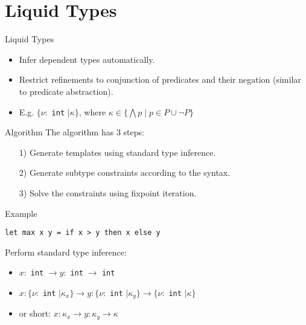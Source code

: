 \documentclass[pdf]{beamer}
\begin{document}
\section{Liquid Types}
\begin{frame}{Liquid Types}
  \begin{itemize}
    \item Infer dependent types automatically.
    \item Restrict refinements to conjunction of predicates and their negation (similar to predicate abstraction).
    \item E.g. $\{\nu:$ \lstinline{int} $\mid \kappa\}$, where $\kappa \in \{\bigwedge p \mid p \in P \cup \neg P\}$
  \end{itemize}
\end{frame}

\begin{frame}{Algorithm}
  The algorithm has 3 steps:
  \begin{itemize}
    \item[1)] Generate templates using standard type inference.
    \item[2)] Generate subtype constraints according to the syntax.
    \item[3)] Solve the constraints using fixpoint iteration.
  \end{itemize}
\end{frame}

\begin{frame}[fragile]{Example}
  \begin{lstlisting}
let max x y = if x > y then x else y
  \end{lstlisting}
  Perform standard type inference:
  \begin{itemize}
    \item $x:$ \lstinline{int} $\rightarrow y:$ \lstinline{int} $\rightarrow$ \lstinline{int}
    \item $x: \{\nu:$ \lstinline{int} $\mid \kappa_x\} \rightarrow y: \{\nu:$ \lstinline{int} $\mid \kappa_y\} \rightarrow \{\nu:$ \lstinline{int} $\mid \kappa\}$
    \item or short: $x: \kappa_x \rightarrow y: \kappa_y \rightarrow \kappa$
  \end{itemize}
\end{frame}
\end{document}
